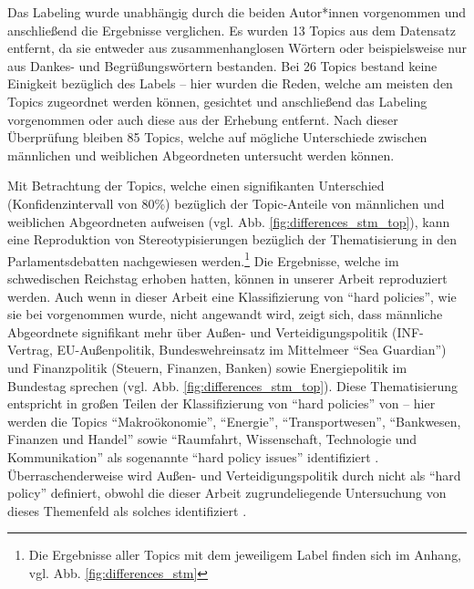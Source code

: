 \documentclass[12pt, 
    twoside=false, 
    bibliography=totoc, 
    numbers=endperiod, 
    headings=normal, 
    toc=chapterentrydotfill
    ]{scrbook}
\begin{document}
Das Labeling wurde unabhängig durch die beiden Autor*innen vorgenommen und anschließend die Ergebnisse verglichen. Es wurden 13 Topics aus dem Datensatz entfernt, da sie entweder aus zusammenhanglosen Wörtern oder beispielsweise nur aus Dankes- und Begrüßungswörtern bestanden. Bei 26 Topics bestand keine Einigkeit bezüglich des Labels -- hier wurden die Reden, welche am meisten den Topics zugeordnet werden können, gesichtet und anschließend das Labeling vorgenommen oder auch diese aus der Erhebung entfernt. Nach dieser Überprüfung bleiben 85 Topics, welche auf mögliche Unterschiede zwischen männlichen und weiblichen Abgeordneten untersucht werden können.

Mit Betrachtung der Topics, welche einen signifikanten Unterschied (Konfidenzintervall von 80\%) bezüglich der Topic-Anteile von männlichen und weiblichen Abgeordneten aufweisen (vgl. Abb. \ref{fig:differences_stm_top}), kann eine Reproduktion von Stereotypisierungen bezüglich der Thematisierung in den Parlamentsdebatten nachgewiesen werden.\footnote{Die Ergebnisse aller Topics mit dem jeweiligem Label finden sich im Anhang, vgl. Abb. \ref{fig:differences_stm}} Die Ergebnisse, welche \textcite[501ff.]{back_2014} im schwedischen Reichstag erhoben hatten, können in unserer Arbeit reproduziert werden. Auch wenn in dieser Arbeit eine Klassifizierung von \enquote{hard policies}, wie sie bei \citeauthor{back_2014} vorgenommen wurde, nicht angewandt wird, zeigt sich, dass männliche Abgeordnete signifikant mehr über Außen- und Verteidigungspolitik (INF-Vertrag, EU-Außenpolitik, Bundeswehreinsatz im Mittelmeer \enquote{Sea Guardian}) und Finanzpolitik (Steuern, Finanzen, Banken) sowie Energiepolitik im Bundestag sprechen (vgl. Abb. \ref{fig:differences_stm_top}). Diese Thematisierung entspricht in großen Teilen der Klassifizierung von \enquote{hard policies} von \citeauthor{back_2014} -- hier werden die Topics \enquote{Makroökonomie}, \enquote{Energie}, \enquote{Transportwesen}, \enquote{Bankwesen, Finanzen und Handel} sowie \enquote{Raumfahrt, Wissenschaft, Technologie und Kommunikation} als sogenannte \enquote{hard policy issues} identifiziert \parencite[510]{back_2014}. Überraschenderweise wird Außen- und Verteidigungspolitik durch \citeauthor{back_2014} nicht als \enquote{hard policy} definiert, obwohl die dieser Arbeit zugrundeliegende Untersuchung von \textcite{reynolds_1999} dieses Themenfeld als solches identifiziert \parencite[564]{reynolds_1999}.

\end{document}
